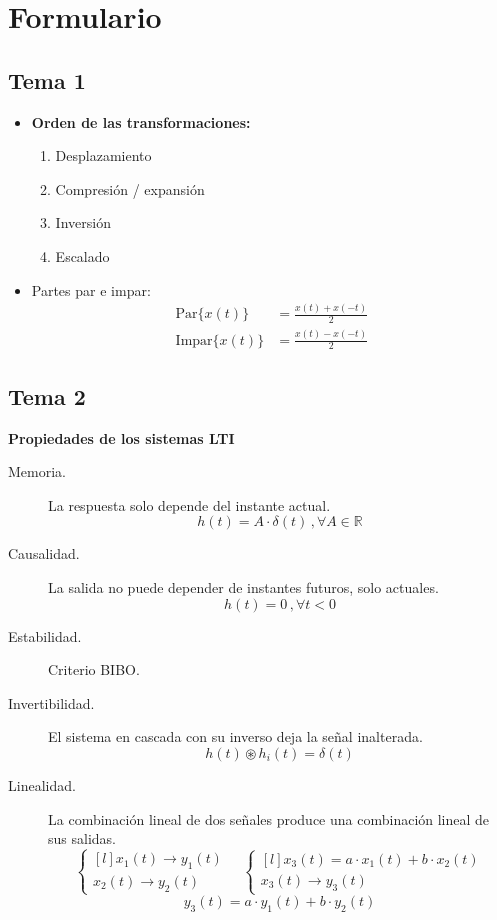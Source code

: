 \documentclass[a4paper]{book}
\begin{document}
\chapter{Formulario}
\begin{multicols}{2}
	\section*{Tema 1}
	\begin{itemize}
		\item \textbf{Orden de las transformaciones:}
		      \begin{enumerate}
			      \item Desplazamiento
			      \item Compresión / expansión
			      \item Inversión
			      \item Escalado
		      \end{enumerate}
		\item Partes par e impar:
		      \begin{align*}
			      \textrm{Par}\{x(t)\}   & = \frac{x(t) + x(-t)}{2} \\[5pt]
			      \textrm{Impar}\{x(t)\} & = \frac{x(t) - x(-t)}{2}
		      \end{align*}
	\end{itemize}

	\section*{Tema 2}
	\textbf{Propiedades de los sistemas LTI}
	\begin{description}
		\item[Memoria.] La respuesta solo depende del instante actual. \[ h(t) = A \cdot \delta (t) \, , \forall A \in \mathbb{R} \]
		\item[Causalidad.] La salida no puede depender de instantes futuros, solo actuales. \[ h(t) = 0 \, , \forall t<0 \]
		\item[Estabilidad.] Criterio BIBO.
		\item[Invertibilidad.] El sistema en cascada con su inverso deja la señal inalterada. \[ h(t) \circledast h_i(t) = \delta (t)\]
		\item[Linealidad.] La combinación lineal de dos señales produce una combinación lineal de sus salidas. \[
				\left\lbrace \begin{matrix*}[l]
					x_1(t) \longrightarrow y_1(t)\\
					x_2(t) \longrightarrow y_2(t)
				\end{matrix*} \right. \quad
				\left\lbrace \begin{matrix*}[l]
					x_3(t) = a \cdot x_1(t) + b \cdot x_2(t)\\
					x_3(t) \longrightarrow y_3(t)
				\end{matrix*} \right.\]
			\[ y_3(t) = a \cdot y_1(t) + b \cdot y_2(t) \]
	\end{description}


\end{multicols}
\end{document}
